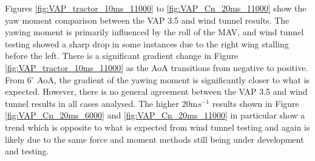Figures \ref{fig:VAP_tractor_10ms_11000} to \ref{fig:VAP_Cn_20ms_11000} show the yaw moment comparison between the VAP 3.5 and wind tunnel results. The yawing moment is primarily influenced by the roll of the \acrshort{MAV}, and wind tunnel testing showed a sharp drop in some instances due to the right wing stalling before the left. There is a significant gradient change in Figure \ref{fig:VAP_tractor_10ms_11000} as the \acrshort{AoA} transitions from negative to positive. From 6$^\circ$ \acrshort{AoA}, the gradient of the yawing moment is significantly closer to what is expected. However, there is no general agreement between the VAP 3.5 and wind tunnel results in all cases analysed. The higher 20m$s^{-1}$ results shown in Figure \ref{fig:VAP_Cn_20ms_6000} and \ref{fig:VAP_Cn_20ms_11000} in particular show a trend which is opposite to what is expected from wind tunnel testing and again is likely due to the same force and moment methods still being under development and testing. 

